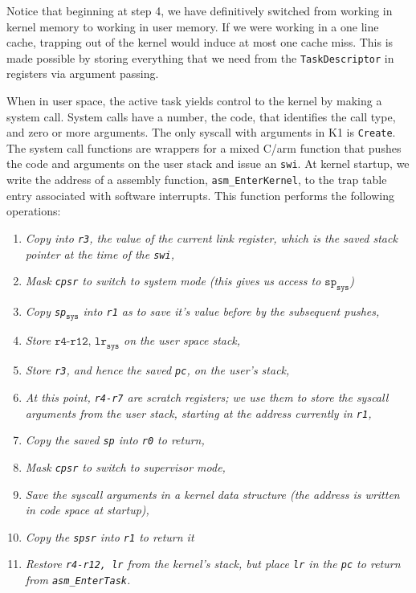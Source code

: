 \documentclass{article}
\begin{document}
Notice that beginning at step 4, we have definitively switched from working in
kernel memory to working in user memory. If we were working in a one line
cache, trapping out of the kernel would induce at most one cache miss. This is
made possible by storing everything that we need from the
\texttt{TaskDescriptor} in registers via argument passing.

When in user space, the active task yields control to the kernel by making a
system call. System calls have a number, the code, that identifies the call
type, and zero or more arguments. The only syscall with arguments in K1 is
\texttt{Create}. The system call functions are wrappers for a mixed C/arm
function that pushes the code and arguments on the user stack and issue an
\texttt{swi}. At kernel startup, we write the address of a assembly function,
\texttt{asm\_EnterKernel}, to the trap table entry associated with software
interrupts. This function performs the following operations:

\begin{enumerate}
    \item \textit{Copy into \texttt{r3}, the value of the current link register,
        which is the saved stack pointer at the time of the \texttt{swi},}
    \item \textit{Mask \texttt{cpsr} to switch to system mode (this gives us
        access to $\texttt{sp}_\texttt{sys}$)}
    \item \textit{Copy \texttt{sp}$_\texttt{sys}$ into \texttt{r1} as to save
        it's value before by the subsequent pushes,}
    \item \textit{Store $\texttt{r4-r12, lr}_\texttt{sys}$ on the user space
        stack,}
    \item \textit{Store \texttt{r3}, and hence the saved \texttt{pc}, on the
        user's stack,}
    \item \textit{At this point, \texttt{r4-r7} are scratch registers; we use
        them to store the syscall arguments from the user stack, starting at the
        address currently in \texttt{r1},}
    \item \textit{Copy the saved \texttt{sp} into \texttt{r0} to return,}
    \item \textit{Mask \texttt{cpsr} to switch to supervisor mode,}
    \item \textit{Save the syscall arguments in a kernel data structure (the
        address is written in code space at startup),}
    \item \textit{Copy the \texttt{spsr} into \texttt{r1} to return it}
    \item \textit{Restore \texttt{r4-r12, lr} from the kernel's stack, but place
        \texttt{lr} in the \texttt{pc} to return from  \texttt{asm\_EnterTask}.}
\end{enumerate}
\end{document}
